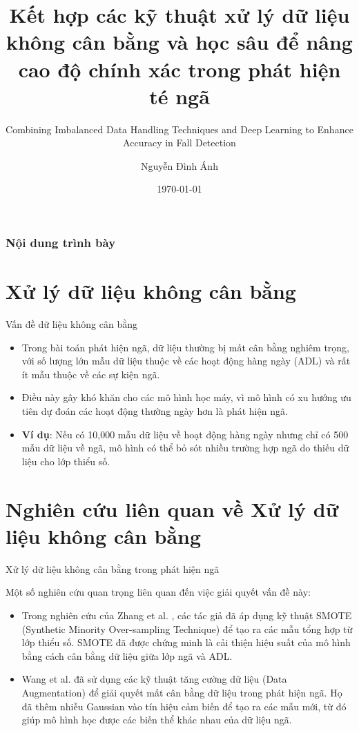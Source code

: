 \documentclass{beamer}
\title[Fall Detection System]
{Kết hợp các kỹ thuật xử lý dữ liệu không cân bằng và học sâu để nâng cao độ chính xác trong phát hiện té ngã}
\subtitle{Combining Imbalanced Data Handling Techniques and Deep Learning to Enhance Accuracy in Fall Detection}
\author[Nguyen Dinh Anh] %
{Nguyễn Đình Ánh}
\institute[HUTECH] %
{
  Bộ môn Công nghệ phần mềm \\
  Khoa Công nghệ Thông tin\\
  Đại học Công nghệ TP. Hồ Chí Minh (HUTECH)
}
\date[HUTECH 2024] %
{\today}
\begin{document}
\frame{\titlepage}

\begin{frame}
\frametitle{Nội dung trình bày}
\tableofcontents
\end{frame}


\section{Xử lý dữ liệu không cân bằng}

\begin{frame}{Vấn đề dữ liệu không cân bằng}
    \begin{itemize}
    \item Trong bài toán phát hiện ngã, dữ liệu thường bị mất cân bằng nghiêm trọng, với số lượng lớn mẫu dữ liệu thuộc về các hoạt động hàng ngày (ADL) và rất ít mẫu thuộc về các sự kiện ngã.
    \item Điều này gây khó khăn cho các mô hình học máy, vì mô hình có xu hướng ưu tiên dự đoán các hoạt động thường ngày hơn là phát hiện ngã.
    \item \textbf{Ví dụ}: Nếu có 10,000 mẫu dữ liệu về hoạt động hàng ngày nhưng chỉ có 500 mẫu dữ liệu về ngã, mô hình có thể bỏ sót nhiều trường hợp ngã do thiếu dữ liệu cho lớp thiểu số.
    \end{itemize}
\end{frame}

\section{Nghiên cứu liên quan về Xử lý dữ liệu không cân bằng}

\begin{frame}{Xử lý dữ liệu không cân bằng trong phát hiện ngã}

Một số nghiên cứu quan trọng liên quan đến việc giải quyết vấn đề này:

\begin{itemize}
    \item Trong nghiên cứu của Zhang et al. \cite{zhang2015imbalanced}, các tác giả đã áp dụng kỹ thuật SMOTE (Synthetic Minority Over-sampling Technique) để tạo ra các mẫu tổng hợp từ lớp thiểu số. SMOTE đã được chứng minh là cải thiện hiệu suất của mô hình bằng cách cân bằng dữ liệu giữa lớp ngã và ADL.
    
    \item Wang et al. \cite{wang2019dataaugmentation} đã sử dụng các kỹ thuật tăng cường dữ liệu (Data Augmentation) để giải quyết mất cân bằng dữ liệu trong phát hiện ngã. Họ đã thêm nhiễu Gaussian vào tín hiệu cảm biến để tạo ra các mẫu mới, từ đó giúp mô hình học được các biến thể khác nhau của dữ liệu ngã.
    
\end{itemize}

\end{frame}
\end{document}
